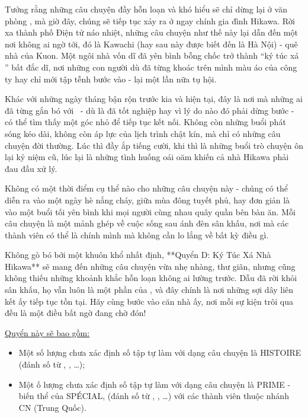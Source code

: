 \documentclass[main.tex]{subfiles}
\begin{document}
Tưởng rằng những câu chuyện đầy hỗn loạn và khó hiểu sẽ chỉ dừng lại ở văn phòng \hll, mà giờ đây, chúng sẽ tiếp tục xảy ra ở ngay chính gia đình Hikawa. Rời xa thành phố Điện tử náo nhiệt, những câu chuyện như thế này lại dẫn đến một nơi không ai ngờ tới, đó là Kawachi (hay sau này được biết đến là Hà Nội) - quê nhà của Kuon. Một ngôi nhà vốn dĩ đã yên bình bỗng chốc trở thành ``ký túc xá \hll'' bất đắc dĩ, nơi những con người dù đã từng khoác trên mình màu áo của công ty hay chỉ mới tập tễnh bước vào - lại một lần nữa tụ hội.

Khác với những ngày tháng bận rộn trước kia và hiện tại, đây là nơi mà những ai đã từng gắn bó với \hll\ - dù là đã tốt nghiệp hay vì lý do nào đó phải dừng bước - có thể tìm thấy một góc nhỏ để tiếp tục kết nối. Không còn những buổi phát sóng kéo dài, không còn áp lực của lịch trình chật kín, mà chỉ có những câu chuyện đời thường. Lúc thì đầy ắp tiếng cười, khi thì là những buổi trò chuyện ôn lại kỷ niệm cũ, lúc lại là những tình huống oái oăm khiến cả nhà Hikawa phải đau đầu xử lý.

Không có một thời điểm cụ thể nào cho những câu chuyện này - chúng có thể diễn ra vào một ngày hè nắng cháy, giữa mùa đông tuyết phủ, hay đơn giản là vào một buổi tối yên bình khi mọi người cùng nhau quây quần bên bàn ăn. Mỗi câu chuyện là một mảnh ghép về cuộc sống sau ánh đèn sân khấu, nơi mà các thành viên có thể là chính mình mà không cần lo lắng về bất kỳ điều gì.

Không gò bó bởi một khuôn khổ nhất định, **Quyển D: Ký Túc Xá Nhà Hikawa** sẽ mang đến những câu chuyện vừa nhẹ nhàng, thư giãn, nhưng cũng không thiếu những khoảnh khắc hỗn loạn không ai lường trước. Dẫu đã rời khỏi sân khấu, họ vẫn luôn là một phần của \hll, và đây chính là nơi những sợi dây liên kết ấy tiếp tục tồn tại. Hãy cùng bước vào căn nhà ấy, nơi mỗi sự kiện trôi qua đều là một điều bất ngờ đang chờ đón!

\underline{Quyển này sẽ bao gồm:}
\begin{itemize}
\item Một số lượng chưa xác định số tập tự làm với dạng câu chuyện là {\flaregothic HISTOIRE} (đánh số từ {}, {}, {}\dots);
\item Một ố lượng chưa xác định số tập tự làm với dạng câu chuyện là {\flaregothic PRIME} - biến thể của {\flaregothic SPÉCIAL}, (đánh số từ {}, {}, {}\dots) với các thành viên thuộc nhánh CN (Trung Quốc).
\end{itemize}
\end{document}
